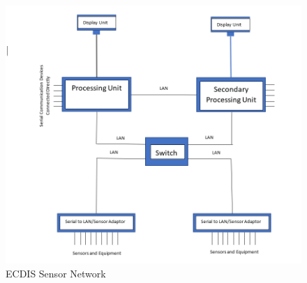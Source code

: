 \documentclass{report}
\begin{document}
\begin{figure}[h]
    \centering
    \includegraphics[width=12cm]{Images and Figures/ECDISsensorNetwork.PNG}
    \caption{ECDIS Sensor Network}
    \label{fig:network}
\end{figure}


\begin{figure}

\end{figure}
\end{document}
